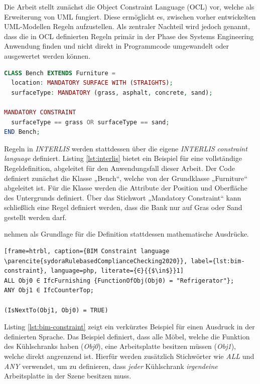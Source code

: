 Die Arbeit stellt zunächst die Object Constraint Language (OCL) vor, welche als Erweiterung von UML fungiert. Diese ermöglicht es, zwischen vorher entwickelten UML-Modellen Regeln aufzustellen. Als zentraler Nachteil wird jedoch genannt, dass die in OCL definierten Regeln primär in der Phase des Systems Engineering Anwendung finden und nicht direkt in Programmcode umgewandelt oder ausgewertet werden können.

\begin{lstlisting}[frame=htrbl, caption={INTERLIS Constraint Language Beispiel}, label={lst:interlis}, language=php]
CLASS Bench EXTENDS Furniture =
  location: MANDATORY SURFACE WITH (STRAIGHTS);
  surfaceType: MANDATORY (grass, asphalt, concrete, sand);

MANDATORY CONSTRAINT
  surfaceType == grass OR surfaceType == sand;
END Bench;
\end{lstlisting}


Regeln in \textit{INTERLIS} werden stattdessen über die eigene \textit{INTERLIS constraint language} definiert. Listing \ref{lst:interlis} bietet ein Beispiel für eine vollständige Regeldefinition, abgeleitet für den Anwendungsfall dieser Arbeit. Der Code definiert zunächst die Klasse „Bench“, welche von der Grundklasse „Furniture“ abgeleitet ist. Für die Klasse werden die Attribute der Position und Oberfläche des Untergrunds definiert. Über das Stichwort „Mandatory Constraint“ kann schließlich eine Regel definiert werden, dass die Bank nur auf Gras oder Sand gestellt werden darf.

\medskip

\textcite{sydoraRulebasedComplianceChecking2020} nehmen als Grundlage für die Definition stattdessen mathematische Ausdrücke. 

\begin{lstlisting}[frame=htrbl, caption={BIM Constraint language \parencite{sydoraRulebasedComplianceChecking2020}}, label={lst:bim-constraint}, language=php, literate={∈}{{$\in$}}1]
ALL Obj0 ∈ IfcFurnishing {FunctionOfObj(Obj0) = "Refrigerator"};
ANY Obj1 ∈ IfcCounterTop;

(IsNextTo(Obj1, Obj0) = TRUE)
\end{lstlisting}

Listing \ref{lst:bim-constraint} zeigt ein verkürztes Beispiel für einen Ausdruck in der definierten Sprache. Das Beispiel definiert, dass alle Möbel, welche die Funktion des Kühlschranks haben (\textit{Obj0}), eine Arbeitsplatte besitzen müssen (\textit{Obj1}), welche direkt angrenzend ist. Hierfür werden zusätzlich Stichwörter wie \textit{ALL} und \textit{ANY} verwendet, um zu definieren, dass \textit{jeder} Kühlschrank \textit{irgendeine} Arbeitsplatte in der Szene besitzen muss.

